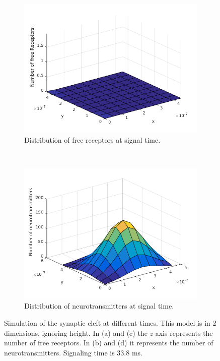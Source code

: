 \begin{figure}[ht]
    \begin{subfigure}[b]{0.45\textwidth}
        \includegraphics[width=\textwidth]{receptordensity}
        \caption{Distribution of free receptors at signal time.}
        \label{fig:receptordensitysignaltime}
    \end{subfigure}
    ~
    \begin{subfigure}[b]{0.45\textwidth}
        \includegraphics[width=\textwidth]{distneurottansmitters}
        \caption{Distribution of neurotransmitters at signal time.}
        \label{fig:concentrationOfReceptors2d}
    \end{subfigure}    
    
    \caption{Simulation of the synaptic cleft at different times. This model is in 2 dimensions, ignoring height. In (a) and (c) the $z$-axis represents the number of free receptors. In (b) and (d) it represents the number of neurotransmitters.  Signaling time is 33.8 ms.}
\end{figure}

